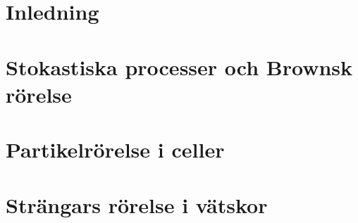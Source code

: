 \documentclass[11pt,a4paper, notitlepage, german, english, swedish]{report}
\begin{document}





\chapter{Inledning}





\chapter{Stokastiska processer och Brownsk rörelse}


\chapter{Partikelrörelse i celler}


\chapter{Strängars rörelse i vätskor}









\newpage


\clearpage
\appendix%
\setcounter{page}{1} %
\renewcommand*{\thepage}{A\arabic{page}}%
\end{document}
